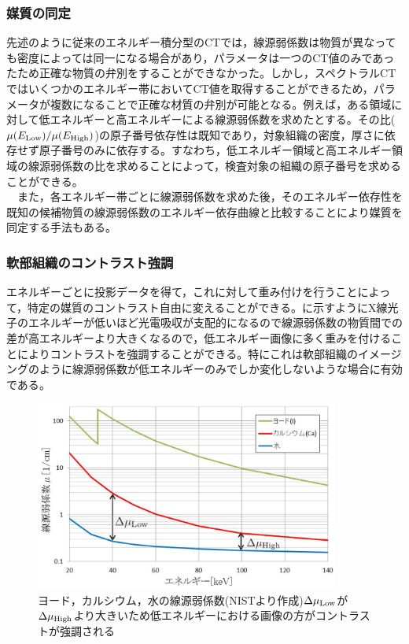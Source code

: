 \subsubsection*{媒質の同定}
先述のように従来のエネルギー積分型のCTでは，線源弱係数は物質が異なっても密度によっては同一になる場合があり，パラメータは一つのCT値のみであったため正確な物質の弁別をすることができなかった。しかし，スペクトラルCTではいくつかのエネルギー帯においてCT値を取得することができるため，パラメータが複数になることで正確な材質の弁別が可能となる。例えば，ある領域に対して低エネルギーと高エネルギーによる線源弱係数を求めたとする。その比($\mu(E_{\rm Low})/\mu(E_{\rm High})$)の原子番号依存性は既知であり，対象組織の密度，厚さに依存せず原子番号のみに依存する。すなわち，低エネルギー領域と高エネルギー領域の線源弱係数の比を求めることによって，検査対象の組織の原子番号を求めることができる\cite{material_id}。\\
\ \ また，各エネルギー帯ごとに線源弱係数を求めた後，そのエネルギー依存性を既知の候補物質の線源弱係数のエネルギー依存曲線と比較することにより媒質を同定する手法もある\cite{ogawa_id}。



\subsubsection*{軟部組織のコントラスト強調}
エネルギーごとに投影データを得て，これに対して重み付けを行うことによって，特定の媒質のコントラスト自由に変えることができる。に示すようにX線光子のエネルギーが低いほど光電吸収が支配的になるので線源弱係数の物質間での差が高エネルギーより大きくなるので，低エネルギー画像に多く重みを付けることによりコントラストを強調することができる。特にこれは軟部組織のイメージングのように線源弱係数が低エネルギーのみでしか変化しないような場合に有効である\cite{kowase}\cite{ogawa_kaisetu}。

\begin{figure}[H]
 \begin{center}
 \includegraphics[width=10cm]{image/other/material_atten.eps}
 \end{center}
  \vspace{-0.7cm}
 \caption{ヨード，カルシウム，水の線源弱係数(NISTより作成)\newline $\Delta\mu_{\rm Low}$が$\Delta\mu_{\rm High}$より大きいため低エネルギーにおける画像の方がコントラストが強調される}
 \label{fig:material_atten}
\end{figure}



